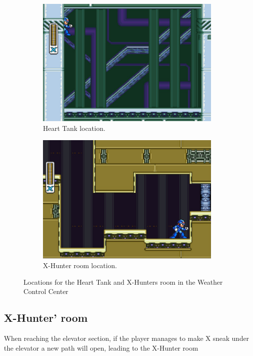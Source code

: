 \begin{figure}[htp]
	\centering
	\begin{subfigure}{0.4\linewidth}
		\centering
		\includegraphics[width=\linewidth]{figures/X2/Wire_sponge/Sponge_heart.jpg}
		\caption{Heart Tank location.}
	\end{subfigure}
	\begin{subfigure}{0.4\linewidth}
		\centering
		\includegraphics[width=\linewidth]{figures/X2/Wire_sponge/Sponge_Hunter_room.jpg}
		\caption{X-Hunter room location.}
	\end{subfigure}
	\caption{Locations for the Heart Tank and X-Hunters room in the Weather Control Center}
\end{figure}
\subsection{X-Hunter' room}
When reaching the elevator section, if the player manages to make X sneak under the elevator a new path will open, leading to the X-Hunter room

